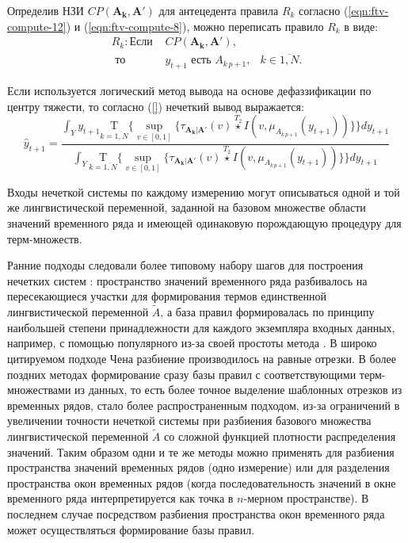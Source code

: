 Определив НЗИ $CP(\mathbf{A_{k}, \mathbf{A'}})$ для антецедента правила $R_k$ согласно (\ref{eqn:ftv-compute-12}) и (\ref{eqn:ftv-compute-8}), можно переписать правило $R_k$ в виде:
\begin{align*}
	R_k: \textrm{Если }&CP(\mathbf{A_{k}, \mathbf{A'}}),&\\
	\textrm{ то }&y_{t+1}\textrm{ есть }A_{k\,p+1},&k\in\overline{1,N}.
\end{align*}


Если используется логический метод вывода на основе дефаззификации по центру тяжести, то согласно (\ref{}) нечеткий вывод выражается:
\begin{equation}
\hat{y}_{t+1} = \frac{\int_Y y_{t+1} \underset{k=\overline{1,N}}{\textrm{T}}\Biggl\{\sup_{v \in [0,1]}\biggl\{\tau_{\mathbf{A_k}|\mathbf{A'}}(v)\overset{T_2}{\star} I(v, \mu_{A_{k\,p+1}}(y_{t+1}))\biggr\}\Biggr\} dy_{t+1}}{\int_Y \underset{k=\overline{1,N}}{\textrm{T}}\Biggl\{\sup_{v \in [0,1]}\biggl\{\tau_{\mathbf{A_k}|\mathbf{A'}}(v)\overset{T_2}{\star} I(v, \mu_{A_{k\,p+1}}(y_{t+1}))\biggr\}\Biggr\} dy_{t+1}}
\end{equation}

Входы нечеткой системы по каждому измерению могут описываться одной и той же лингвистической переменной, заданной на базовом множестве области значений временного ряда и имеющей одинаковую порождающую процедуру для терм-множеств.

 Ранние подходы следовали более типовому набору шагов для построения нечетких систем \cite{Chellai2022}: пространство значений временного ряда разбивалось на пересекающиеся участки для формирования термов единственной лингвистической переменной $\tilde{A}$, а база правил формировалась по принципу наибольшей степени принадлежности для каждого экземпляра входных данных, например, с помощью популярного из-за своей простоты метода \cite{Wang1992}. В широко цитируемом подходе Чена \cite{Chen1996} разбиение производилось на равные отрезки. В более поздних методах формирование сразу базы правил с соответствующими терм-множествами из данных, то есть более точное выделение шаблонных отрезков из временных рядов, стало более распространенным подходом, из-за ограничений в увеличении точности нечеткой системы при разбиения базового множества лингвистической переменной $\tilde{A}$ со сложной функцией плотности распределения значений. Таким образом одни и те же методы можно применять для разбиения пространства значений временных рядов (одно измерение) или для разделения пространства окон временных рядов (когда последовательность значений в окне временного ряда интерпретируется как точка в $n$-мерном пространстве). В последнем случае посредством разбиения пространства окон временного ряда может осуществляться формирование базы правил.

